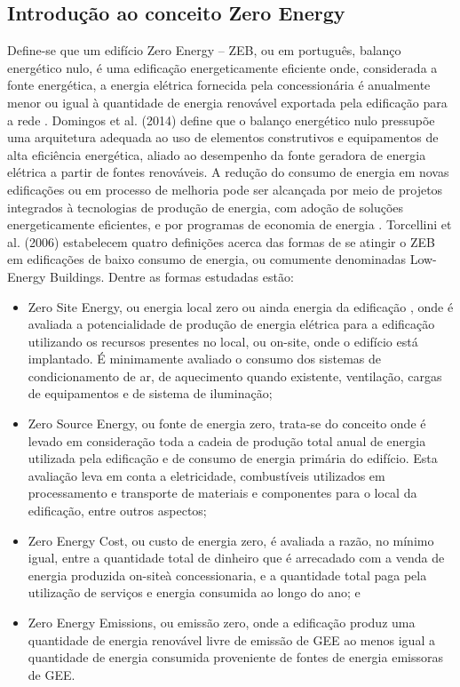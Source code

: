 \subsection{Introdução ao conceito Zero Energy}
Define-se que um edifício Zero Energy – ZEB, ou em português, balanço 
energético nulo, é uma edificação  energeticamente  eficiente  onde,  
considerada  a  fonte  energética,  a  energia  elétrica fornecida pela 
concessionária é anualmente menor ou igual à quantidade de energia renovável 
exportada pela edificação para a rede 
\cite{Torcellini2006,U.S.DepartmentofEnergy-USDOE2012,U.S.DepartmentofEnergy-USDOE2015}. 
Domingos et al.  (2014)  define  que  o  balanço  energético  nulo  pressupõe  
uma  arquitetura adequada ao uso de elementos construtivos e equipamentos 
de alta eficiência energética, aliado ao desempenho da fonte geradora de 
energia elétrica a partir de fontes renováveis. A redução do consumo de 
energia em novas edificações ou em processo de melhoria pode ser alcançada 
por meio de projetos integrados à tecnologias de produção de energia, com 
adoção de soluções   energeticamente   eficientes,   e   por   programas   
de   economia   de   energia \cite{U.S.DepartmentofEnergy-USDOE2015}. 
Torcellini et al. (2006) estabelecem quatro definições acerca das formas de 
se atingir o ZEB em edificações  de  baixo  consumo  de  energia,  ou  
comumente  denominadas Low-Energy Buildings. Dentre as formas estudadas estão: 
\begin{itemize}
    \item Zero Site Energy, ou energia local zero ou ainda energia da 
    edificação \cite{U.S.DepartmentofEnergy-USDOE2015}, onde é avaliada a 
    potencialidade de produção de energia elétrica para a  edificação  
    utilizando  os  recursos  presentes  no  local,  ou on-site,  onde  o  
    edifício  está implantado. É minimamente avaliado o consumo dos 
    sistemas de condicionamento de ar, de aquecimento quando existente, 
    ventilação, cargas de equipamentos e de sistema de iluminação;
    \item Zero Source Energy,  ou  fonte  de  energia  zero,  trata-se  do  
    conceito  onde  é  levado  em consideração toda a cadeia de produção 
    total anual de energia utilizada pela edificação e de consumo de 
    energia primária do edifício. Esta avaliação leva em conta a 
    eletricidade, combustíveis utilizados em processamento e transporte de 
    materiais e componentes para o local da edificação, entre outros aspectos;
    \item Zero Energy Cost, ou custo de energia zero, é avaliada a razão, 
    no mínimo igual, entre a quantidade total de dinheiro que é arrecadado 
    com a venda de energia produzida on-siteà  concessionaria,  e  a  
    quantidade  total  paga  pela  utilização  de  serviços  e  energia 
    consumida ao longo do ano; e 
    \item Zero Energy Emissions,  ou  emissão  zero,  onde  a  edificação  
    produz  uma  quantidade  de energia  renovável  livre  de  emissão  
    de  GEE  ao  menos  igual  a  quantidade  de  energia consumida 
    proveniente de fontes de energia emissoras de GEE.
\end{itemize}